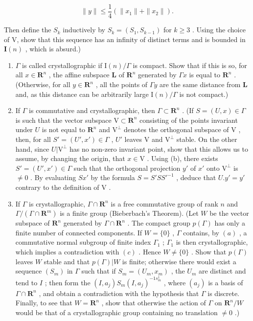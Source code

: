 \[
\| y \| \leqslant \frac {1}{4} (\| x _ {1} \| + \| x _ {2} \|).
\]

Then define the \(S_{k}\) inductively by \(S_{k}=(S_{1},S_{k-1})\) for \(k\geqslant3\) . Using the choice of V, show that this sequence has an infinity of distinct terms and is bounded in \(\mathbf{I}(n)\) , which is absurd.)

\begin{enumerate}
\def\labelenumi{(\alph{enumi})}
\setcounter{enumi}{1}
\item
  \(\Gamma\) is called crystallographic if \(\mathrm{I}(n)/\Gamma\) is compact. Show that if this is so, for all \(x \in \mathbf{R}^n\) , the affine subspace \(\mathbf{L}\) of \(\mathbf{R}^n\) generated by \(\Gamma x\) is equal to \(\mathbf{R}^n\) . (Otherwise, for all \(y \in \mathbf{R}^n\) , all the points of \(\Gamma y\) are the same distance from \(\mathbf{L}\) and, as this distance can be arbitrarily large \(\mathrm{I}(n)/\Gamma\) is not compact.)
\item
  If \(\Gamma\) is commutative and crystallographic, then \(\Gamma \subset \mathbf{R}^n\) . (If \(S = (U, x) \in \Gamma\) is such that the vector subspace \(\mathrm{V} \subset \mathbf{R}^n\) consisting of the points invariant under \(U\) is not equal to \(\mathbf{R}^n\) and \(\mathrm{V}^\perp\) denotes the orthogonal subspace of \(\mathrm{V}\) , then, for all \(S' = (U', x') \in \Gamma\) , \(U'\) leaves \(\mathrm{V}\) and \(\mathrm{V}^\perp\) stable. On the other hand, since \(U|\mathrm{V}^\perp\) has no non-zero invariant point, show that this allows us to assume, by changing the origin, that \(x \in \mathrm{V}\) . Using (b), there exists \(S' = (U', x') \in \Gamma\) such that the orthogonal projection \(y'\) of \(x'\) onto \(\mathrm{V}^\perp\) is \(\neq 0\) . By evaluating \(Sx'\) by the formula \(S = S'SS'^{-1}\) , deduce that \(U.y' = y'\) contrary to the definition of \(\mathrm{V}\) .
\item
  If \(\Gamma\) is crystallographic, \(\Gamma \cap \mathbf{R}^n\) is a free commutative group of rank \(n\) and \(\Gamma / (\Gamma \cap \mathbf{R}^m)\) is a finite group (Bieberbach's Theorem). (Let \(W\) be the vector subspace of \(\mathbf{R}^n\) generated by \(\Gamma \cap \mathbf{R}^n\) . The compact group \(p(\Gamma)\) has only a finite number of connected components. If \(W = \{0\}\) , \(\Gamma\) contains, by \((a)\) , a commutative normal subgroup of finite index \(\Gamma_1\) ; \(\Gamma_1\) is then crystallographic, which implies a contradiction with \((c)\) . Hence \(W \neq \{0\}\) . Show that \(p(\Gamma)\) leaves \(W\) stable and that \(p(\Gamma)|W\) is finite; otherwise there would exist a sequence \((S_m)\) in \(\Gamma\) such that if \(S_m = (U_m, x_m)\) , the \(U_m\) are distinct and tend to \(I\) ; then form the \((I, a_j)S_m(I, a_j)^{-1s_m^1}\) , where \((a_j)\) is a basis of \(\Gamma \cap \mathbf{R}^n\) , and obtain a contradiction with the hypothesis that \(\Gamma\) is discrete. Finally, to see that \(W = \mathbf{R}^n\) , show that otherwise the action of \(\Gamma\) on \(\mathbf{R}^n/W\) would be that of a crystallographic group containing no translation \(\neq 0\) .)
\end{enumerate}

